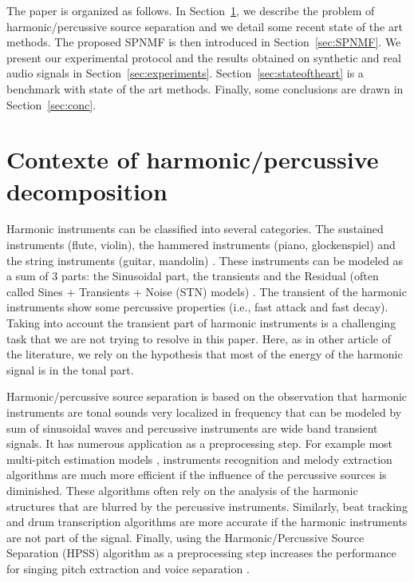 \documentclass[journal]{IEEEtran}
\begin{document}
The paper is organized as follows. In Section~\ref{sec:Background}, we describe the problem of harmonic/percussive source separation and we detail some recent state of the art methods. The proposed SPNMF is then introduced in Section~\ref{sec:SPNMF}. We present our experimental protocol and the results obtained on synthetic and real audio signals in Section~\ref{sec:experiments}. Section~\ref{sec:stateoftheart} is a benchmark with state of the art methods. Finally, some conclusions are drawn in Section~\ref{sec:conc}.



\section{Contexte of harmonic/percussive decomposition}\label{sec:Background}


Harmonic instruments can be classified into several categories. The sustained instruments (flute, violin), the hammered instruments (piano, glockenspiel) and the string instruments (guitar, mandolin) \cite{peeters2003automatic,peeters2003hierarchical}. These instruments can be modeled as a sum of $3$ parts: the Sinusoidal part, the transients and the Residual (often called Sines + Transients + Noise (STN) models) \cite{daudet2006review}. The transient of the harmonic instruments show some percussive properties (i.e., fast attack and fast decay). Taking into account the transient part of harmonic instruments is a challenging task that we are not trying to resolve in this paper. Here, as in other article of the literature, we rely on the hypothesis that most of the energy of the harmonic signal is in the tonal part. 

Harmonic/percussive source separation is based on the observation that harmonic instruments are tonal sounds very localized in frequency that can be modeled by sum of sinusoidal waves and percussive instruments are wide band transient signals. It has numerous application as a preprocessing step. For example most multi-pitch estimation models \cite{klapuri2008multipitch}, instruments recognition and melody extraction \cite{salamon2012melody} algorithms are much more efficient if the influence of the percussive sources is diminished. These algorithms often rely on the analysis of the harmonic structures that are blurred by the percussive instruments. Similarly, beat tracking \cite{ellis2007beat} and drum transcription algorithms \cite{paulus2005drum} are more accurate if the harmonic instruments are not part of the signal. Finally, using the Harmonic/Percussive Source Separation (HPSS) algorithm \cite{fitzgerald2010harmonic} as a preprocessing step increases the performance for singing pitch extraction and voice separation \cite{hsu2012tandem}.
\end{document}

